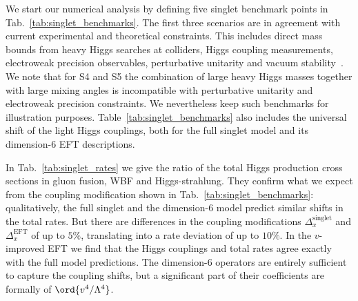 We start our numerical analysis by defining five singlet benchmark
points in Tab.~\ref{tab:singlet_benchmarks}.  The first three
scenarios are in agreement with current experimental and theoretical
constraints.  This includes direct mass bounds from heavy Higgs
searches at colliders, Higgs coupling measurements, electroweak
precision observables, perturbative unitarity and vacuum
stability~\cite{singlet_bounds}. We note that for S4 and S5 the
combination of large heavy Higgs masses together with large mixing
angles is incompatible with perturbative unitarity and electroweak
precision constraints.  We nevertheless keep such benchmarks for
illustration purposes. Table~\ref{tab:singlet_benchmarks} also
includes the universal shift of the light Higgs couplings, both for
the full singlet model and its dimension-6 EFT descriptions.\medskip

In Tab.~\ref{tab:singlet_rates} we give the ratio of the total Higgs
production cross sections in gluon fusion, WBF and
Higgs-strahlung. They confirm what we expect from the coupling
modification shown in Tab.~\ref{tab:singlet_benchmarks}:
qualitatively, the full singlet and the dimension-6 model predict
similar shifts in the total rates.  But there are differences in the
coupling modifications $\Delta_x^\text{singlet}$ and
$\Delta_x^\text{EFT}$ of up to $5\%$, translating into a rate
deviation of up to $10 \%$. In the $v$-improved EFT we find that the
Higgs couplings and total rates agree exactly with the full model
predictions. The dimension-6 operators are entirely sufficient to
capture the coupling shifts, but a significant part of their
coefficients are formally of $\ord{v^4/\Lambda^4}$.\medskip

